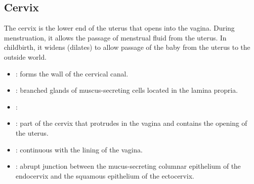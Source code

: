 \subsection{Cervix}
The cervix is the lower end of the uterus that opens into the vagina. During menstruation, it allows the passage of menstrual fluid from the uterus. In childbirth, it widens (dilates) to allow passage of the baby from the uterus to the outside world.
\bigskip
\begin{center}
\end{center}
\bigskip
\begin{multicols}{2}
\begin{itemize}
  \item {}: forms the wall of the cervical canal. 
  
  \begin{center}
  \end{center}
  
  \item {}:  branched glands of muscus-secreting cells located in the lamina propria.
  
  \begin{center}
  \end{center}
  
  \item {}:
  
  \begin{center}
  \end{center}
  
  \item {}: part of the cervix that protrudes in the vagina and contains the opening of the uterus. 
  
  \begin{center}
  \end{center}

  \item {}: continuous with the lining of the vagina.
  
  \begin{center}
  \end{center}
  
  \item {}: abrupt junction between the mucus-secreting columnar epithelium of the endocervix and the squamous epithelium of the ectocervix.
  

\end{itemize}
\end{multicols}
